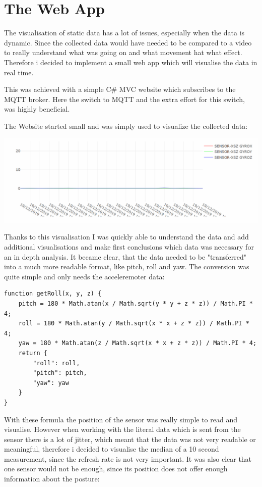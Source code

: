 \section{The Web App}

The visualisation of static data has a lot of issues, especially when the data is dynamic. Since the collected data would have needed to be compared to a video to really understand what was going on and what movement hat what effect. Therefore i decided to implement a small web app which will visualise the data in real time. 

This was achieved with a simple C\# MVC website which subscribes to the MQTT broker. Here the switch to MQTT and the extra effort for this switch, was highly beneficial.

The Website started small and was simply used to visualize the collected data:

\includegraphics[width=\linewidth]{images/WebVisualisation_SIMPLE.png}

Thanks to this visualisation I was quickly able to understand the data and add additional visualisations and make first conclusions which data was necessary for an in depth analysis. It became clear, that the data needed to be "transferred" into a much more readable format, like pitch, roll and yaw.
The conversion was quite simple and only needs the acceleremoter data:

\begin{lstlisting}
function getRoll(x, y, z) {
    pitch = 180 * Math.atan(x / Math.sqrt(y * y + z * z)) / Math.PI * 4;
    roll = 180 * Math.atan(y / Math.sqrt(x * x + z * z)) / Math.PI * 4;
    yaw = 180 * Math.atan(z / Math.sqrt(x * x + z * z)) / Math.PI * 4;
    return {
        "roll": roll,
        "pitch": pitch,
        "yaw": yaw
    }
}
\end{lstlisting}

With these formula the position of the sensor was really simple to read and visualise. However when working with the literal data which is sent from the sensor there is a lot of jitter, which meant that the data was not very readable or meaningful, therefore i decided to visualise the median of a 10 second measurement, since the refresh rate is not very important. It was also clear that one sensor would not be enough, since its position does not offer enough information about the posture: 

